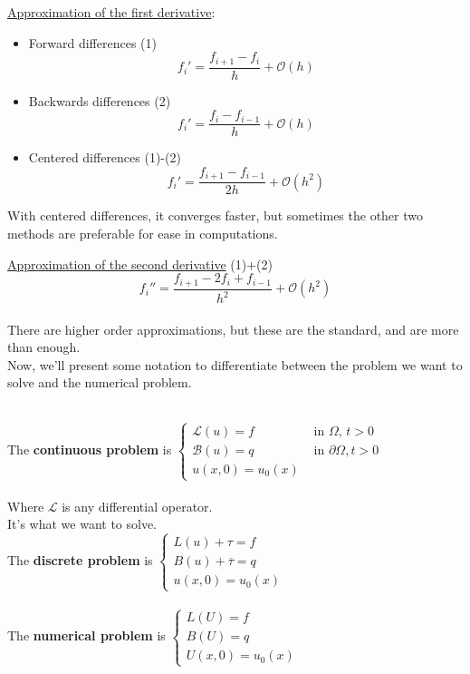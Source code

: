 \underline{Approximation of the first derivative}: \\
\begin{itemize}
    \item Forward differences (1) $$f_i' = \frac{f_{i+1} - f_i}{h} + \mathcal{O}(h)$$
    \item Backwards differences (2) $$f_i' = \frac{f_i-f_{i-1}}{h} + \mathcal{O}(h)$$
    \item Centered differences (1)-(2) $$f_i' = \frac{f_{i+1} - f_{i-1}}{2h} + \mathcal{O}(h^2)$$
\end{itemize}

\begin{remark}
  With centered differences, it converges faster, but sometimes the other two methods are preferable for ease in computations.
\end{remark}

\underline{Approximation of the second derivative} (1)+(2) $$f_i'' = \frac{f_{i+1} - 2f_i + f_{i-1}}{h^2} + \mathcal{O}(h^2)$$\\

There are higher order approximations, but these are the standard, and are more than enough. \\

Now, we'll present some notation to differentiate between the problem we want to solve and the numerical problem.

\begin{definition}\-\\
  The \textbf{continuous problem} is 
  $
    \begin{cases}
      \mathcal{L}(u) = f &\text{ in } \Omega, \, t > 0 \\
      \mathcal{B}(u) = q &\text{ in } \partial \Omega, t > 0 \\
      u(x,0) = u_0(x)
    \end{cases}
  $\\
  
  \-\\Where $\mathcal{L}$ is any differential operator. \\
  
  It's what we want to solve. \\
  
  The \textbf{discrete problem} \hspace{0.08cm}is\hspace{0.3cm}
  $
    \begin{cases}
      L(u) + \tau = f \\
      B(u) + \overline{\tau} = q \\
      u(x,0) = u_0(x)
    \end{cases}
  $\\
  
  \-\\The \textbf{numerical problem} is
  $
    \begin{cases}
      L(U) = f \\
      B(U) = q \\
      U(x,0) = u_0(x)
    \end{cases}
  $
\end{definition}


